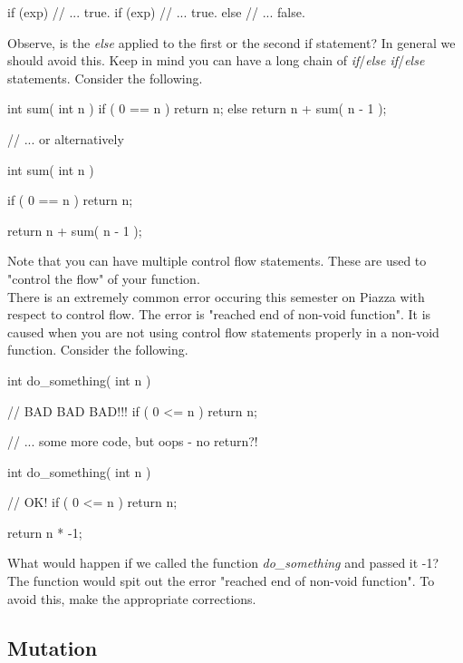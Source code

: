\begin{code}[c]
if (exp)
	// ... true.
	if (exp)
		// ... true.
else
	// ... false.
\end{code}

Observe, is the \emph{else} applied to the first or the second if statement? In general we should avoid this. Keep in mind you can have a long chain of \textit{if}/\textit{else if}/\textit{else} statements. Consider the following.\\


\clearpage
\begin{code}[c]
int sum( int n ) {
	if ( 0 == n ) {
		return n;
	} else {
		return n + sum( n - 1 );
	}
}

// ... or alternatively

int sum( int n ) {
	if ( 0 == n ) {
		return n;
	}
	
	return n + sum( n - 1 );
}
\end{code}

Note that you can have multiple control flow statements. These are used to "control the flow" of your function.\\

There is an extremely common error occuring this semester on Piazza with respect to control flow. The error is "reached end of non-void function". It is caused when you are not using control flow statements properly in a non-void function. Consider the following.\\

\begin{code}[c]
int do_something( int n ) { // BAD BAD BAD!!!
	if ( 0 <= n ) {
		return n;
	}
	
	// ... some more code, but oops - no return?!
}

int do_something( int n ) { // OK!
	if ( 0 <= n ) {
		return n;
	}
	
	return n * -1;
}
\end{code}

What would happen if we called the function \emph{do\_something} and passed it -1? The function would spit out the error "reached end of non-void function". To avoid this, make the appropriate corrections.\\

\subsection{Mutation}

